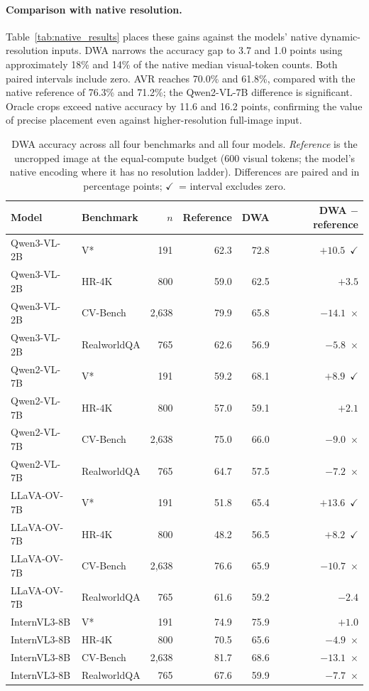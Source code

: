 \documentclass{article} %
\newcommand{\bad}[1]{\textcolor{bad}{#1}}
\newcommand{\gd}[1]{\textcolor{gd}{#1}}
\newcommand{\ok}{\gd{$\checkmark$}}
\newcommand{\no}{\bad{$\times$}}
\begin{document}
\paragraph{Comparison with native resolution.}
Table~\ref{tab:native_results} places these gains against the models'
native dynamic-resolution inputs. DWA narrows the accuracy gap to
3.7 and 1.0 points using approximately 18\% and 14\% of the native
median visual-token counts. Both paired intervals include zero.
AVR reaches 70.0\% and 61.8\%, compared with the native reference
of 76.3\% and 71.2\%; the Qwen2-VL-7B difference is significant.
Oracle crops exceed native accuracy by 11.6 and 16.2 points,
confirming the value of precise placement even against
higher-resolution full-image input.


\begin{table}[t]
\centering\small
\setlength{\tabcolsep}{4pt}
\caption{DWA accuracy across all four benchmarks and all four models. \emph{Reference} is the uncropped image at the equal-compute budget ($600$ visual tokens; the model's native encoding where it has no resolution ladder). Differences are paired and in percentage points; \ok\ = interval excludes zero.}
\label{tab:dwa_all}
\begin{tabular}{llrrrr}
\toprule
Model & Benchmark & $n$ & Reference & DWA & DWA $-$ reference \\
\midrule
Qwen3-VL-2B & V* & 191 & 62.3 & 72.8 & \gd{$+10.5$}~\ok \\
Qwen3-VL-2B & HR-4K & 800 & 59.0 & 62.5 & $+3.5$ \\
Qwen3-VL-2B & CV-Bench & 2{,}638 & 79.9 & 65.8 & \bad{$-14.1$}~\no \\
Qwen3-VL-2B & RealworldQA & 765 & 62.6 & 56.9 & \bad{$-5.8$}~\no \\
\midrule
Qwen2-VL-7B & V* & 191 & 59.2 & 68.1 & \gd{$+8.9$}~\ok \\
Qwen2-VL-7B & HR-4K & 800 & 57.0 & 59.1 & $+2.1$ \\
Qwen2-VL-7B & CV-Bench & 2{,}638 & 75.0 & 66.0 & \bad{$-9.0$}~\no \\
Qwen2-VL-7B & RealworldQA & 765 & 64.7 & 57.5 & \bad{$-7.2$}~\no \\
\midrule
LLaVA-OV-7B & V* & 191 & 51.8 & 65.4 & \gd{$+13.6$}~\ok \\
LLaVA-OV-7B & HR-4K & 800 & 48.2 & 56.5 & \gd{$+8.2$}~\ok \\
LLaVA-OV-7B & CV-Bench & 2{,}638 & 76.6 & 65.9 & \bad{$-10.7$}~\no \\
LLaVA-OV-7B & RealworldQA & 765 & 61.6 & 59.2 & $-2.4$ \\
\midrule
InternVL3-8B & V* & 191 & 74.9 & 75.9 & $+1.0$ \\
InternVL3-8B & HR-4K & 800 & 70.5 & 65.6 & \bad{$-4.9$}~\no \\
InternVL3-8B & CV-Bench & 2{,}638 & 81.7 & 68.6 & \bad{$-13.1$}~\no \\
InternVL3-8B & RealworldQA & 765 & 67.6 & 59.9 & \bad{$-7.7$}~\no \\
\bottomrule
\end{tabular}
\end{table}
\end{document}
